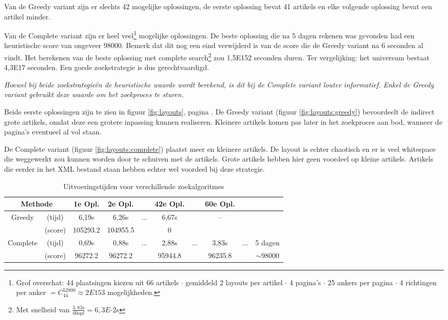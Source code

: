\documentclass[a4paper,12pt]{report}
\begin{document}
Van de Greedy variant zijn er slechts 42 mogelijke oplossingen, de eerste oplossing bevat 41 artikels en elke volgende oplossing bevat een artikel minder.

Van de Complete variant zijn er heel veel\footnote{Grof overschat: 44 plaatsingen kiezen uit 66 artikels  $\cdot$ gemiddeld 2 layouts per artikel $\cdot$ 4 pagina's $\cdot$ 25 ankers per pagina $\cdot$ 4 richtingen per anker $ = C^{52800}_{44} \approx 2E153$ mogelijkheden.} mogelijke oplossingen. De beste oplossing die na 5 dagen rekenen was gevonden had een heuristische score van ongeveer 98000. Bemerk dat dit nog een eind verwijderd is van de score die de Greedy variant na 6 seconden al vindt. Het berekenen van de beste oplossing met complete search\footnote{Met snelheid van $\frac{3,83s}{60 opl} = 6,3E$-2s} zou 1,5E152 seconden duren. Ter vergelijking: het universum bestaat 4,3E17 seconden. Een goede zoekstrategie is dus gerechtvaardigd.

\textit{Hoewel bij beide zoekstrategieën de heuristische waarde wordt berekend, is dit bij de Complete variant louter informatief. Enkel de Greedy variant gebruikt deze waarde om het zoekproces te sturen.}

Beide eerste oplossingen zijn te zien in figuur \ref{fig:layouts}, pagina \pageref{fig:layouts}. De Greedy variant (figuur \ref{fig:layouts:greedy}) bevoordeelt de indirect grote artikels, omdat deze een grotere inpassing kunnen realiseren. Kleinere artikels komen pas later in het zoekproces aan bod, wanneer de pagina's eventueel al vol staan. 

De Complete variant (figuur \ref{fig:layouts:complete}) plaatst meer en kleinere artikels. De layout is echter chaotisch en er is veel whitespace die weggewerkt zou kunnen worden door te schuiven met de artikels. Grote artikels hebben hier geen voordeel op kleine artikels. Artikels die eerder in het XML bestand staan hebben echter wel voordeel bij deze strategie.

\begin{table}[h]
  \centering
  \begin{tabular}{cc|cccccccc}
	\multicolumn{2}{c}{Methode} & 1e Opl. & 2e Opl. & & 42e Opl. & & 60e Opl. \\
	\hline	
    Greedy & (tijd)	& 6,19s & 6,26s & $\ldots$ & 6,67s & & --  \\ 
    & (score) & 105293.2 & 104955.5 & & 0 \\ \hline
    Complete & (tijd) & 0,69s & 0,88s & $\ldots$ & 2,88s & $\ldots$ & 3,83s & $\ldots$ & 5 dagen\\
     & (score) & 96272.2 &  96272.2 & & 95944.8 & & 96235.8 & & $\sim$98000\\
  \end{tabular}
  \caption{Uitvoeringstijden voor verschillende zoekalgoritmes}
  \label{tab:exectimesalg2}
\end{table}
		
\end{document}
